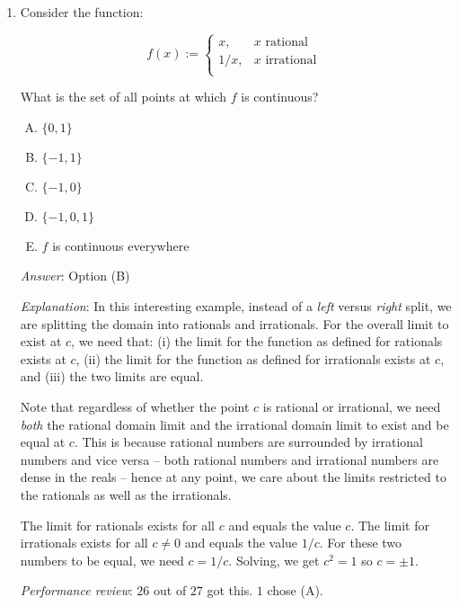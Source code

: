 \documentclass[10pt]{amsart}
\begin{document}
\begin{enumerate}
  {\em Performance review}: $23$ out of $27$ got this. $3$ chose (D),
  $1$ chose (B).

  {\em Historical note (last time)}: $24$ out of $49$ people got this
  correct. $12$ chose (A), $8$ chose (D), $3$ chose (E), $2$ chose (B).


\item Consider the function:

  $$f(x) := \left \lbrace\begin{array}{rl} x, & x \text{ rational }\\1/x, & x \text{ irrational }\\\end{array}\right.$$

  What is the set of all points at which $f$ is continuous? 

  \begin{enumerate}[(A)]
  \item $\{ 0, 1 \}$
  \item $\{ -1,1 \}$
  \item $\{-1,0 \}$
  \item $\{ -1,0,1 \}$
  \item $f$ is continuous everywhere
  \end{enumerate}
  {\em Answer}: Option (B)

  {\em Explanation}: In this interesting example, instead of a {\em
  left} versus {\em right} split, we are splitting the domain into
  rationals and irrationals. For the overall limit to exist at $c$, we
  need that: (i) the limit for the function as defined for rationals
  exists at $c$, (ii) the limit for the function as defined for
  irrationals exists at $c$, and (iii) the two limits are equal.

  Note that regardless of whether the point $c$ is rational or
  irrational, we need {\em both} the rational domain limit and the
  irrational domain limit to exist and be equal at $c$. This is
  because rational numbers are surrounded by irrational numbers and
  vice versa -- both rational numbers and irrational numbers are dense
  in the reals -- hence at any point, we care about the limits
  restricted to the rationals as well as the irrationals.

  The limit for rationals exists for all $c$ and equals the value
  $c$. The limit for irrationals exists for all $c \ne 0$ and equals
  the value $1/c$. For these two numbers to be equal, we need $c =
  1/c$. Solving, we get $c^2 = 1$ so $c = \pm 1$.

  {\em Performance review}: $26$ out of $27$ got this. $1$ chose (A).


\end{enumerate}
\end{document}
